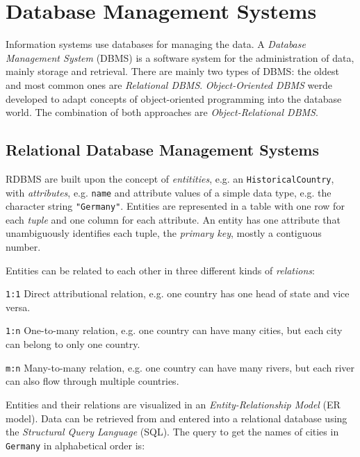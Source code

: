 

\section{Database Management Systems} %
\label{sec:database_management_systems}

Information systems use databases for managing the data. A \emph{Database Management System} (DBMS) is a software system for the administration of data, mainly storage and retrieval. There are mainly two types of DBMS: the oldest and most common ones are \emph{Relational DBMS}. \emph{Object-Oriented DBMS} werde developed to adapt concepts of object-oriented programming into the database world. The combination of both approaches are \emph{Object-Relational DBMS}.

\subsection{Relational Database Management Systems} %
\label{sub:relational_database_management_systems}

RDBMS are built upon the concept of \emph{entitities}, e.g. an \texttt{HistoricalCountry}, with \emph{attributes}, e.g. \texttt{name} and attribute values of a simple data type, e.g. the character string \texttt{"Germany"}. Entities are represented in a table with one row for each \emph{tuple} and one column for each attribute. An entity has one attribute that unambiguously identifies each tuple, the \emph{primary key}, mostly a contiguous number.

Entities can be related to each other in three different kinds of \emph{relations}:
\begin{compactenum}
  \item[\texttt{1:1}] Direct attributional relation, e.g. one country has one head of state and vice versa.
  \item[\texttt{1:n}] One-to-many relation, e.g. one country can have many cities, but each city can belong to only one country.
  \item[\texttt{m:n}] Many-to-many relation, e.g. one country can have many rivers, but each river can also flow through multiple countries.
\end{compactenum}

Entities and their relations are visualized in an \emph{Entity-Relationship Model} (ER model). Data can be retrieved from and entered into a relational database using the \emph{Structural Query Language} (SQL). The query to get the names of cities in \texttt{Germany} in alphabetical order is:

